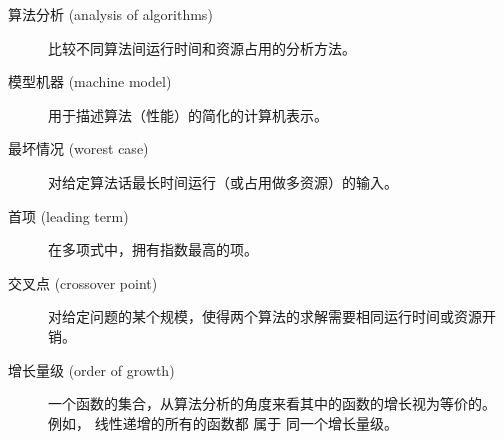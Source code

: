 \begin{description}


\item[算法分析 (analysis of algorithms)] 比较不同算法间运行时间和资源占用的分析方法。


\item[模型机器 (machine model)] 用于描述算法（性能）的简化的计算机表示。


\item[最坏情况 (worest case)] 对给定算法话最长时间运行（或占用做多资源）的输入。


\item[首项 (leading term)] 在多项式中，拥有指数最高的项。


\item[交叉点 (crossover point)] 对给定问题的某个规模，使得两个算法的求解需要相同运行时间或资源开销。


\item [增长量级 (order of growth)] 一个函数的集合，从算法分析的角度来看其中的函数的增长视为等价的。 例如， 线性递增的所有的函数都 属于 同一个增长量级。



\end{description}

